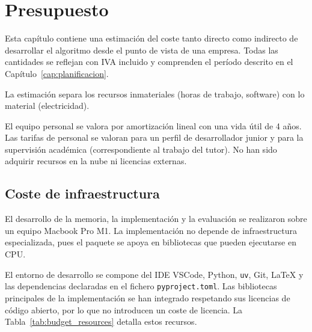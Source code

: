 \documentclass[12pt]{report} %
\begin{document}
\chapter{Presupuesto}
\label{cap:presupuesto}

Esta capítulo contiene una estimación del coste tanto directo como indirecto de desarrollar el algoritmo desde el punto de vista de una empresa. Todas las cantidades se reflejan con IVA incluido y comprenden el período descrito en el Capítulo~\ref{cap:planificacion}.

La estimación separa los recursos inmateriales (horas de trabajo, software) con lo material (electricidad).

El equipo personal se valora por amortización lineal con una vida útil de 4 años. Las tarifas de personal se valoran para un perfil de desarrollador junior y para la supervisión académica (correspondiente al trabajo del tutor). No han sido adquirir recursos en la nube ni licencias externas.

\section{Coste de infraestructura}

El desarrollo de la memoria, la implementación y la evaluación se realizaron sobre un equipo Macbook Pro M1. La implementación no depende de infraestructura especializada, pues el paquete se apoya en bibliotecas que pueden ejecutarse en CPU.

El entorno de desarrollo se compone del IDE VSCode, Python, \texttt{uv}, Git, \LaTeX{} y las dependencias declaradas en el fichero \texttt{pyproject.toml}. Las bibliotecas principales de la implementación se han integrado respetando sus licencias de código abierto, por lo que no introducen un coste de licencia. La Tabla~\ref{tab:budget_resources} detalla estos recursos.
\end{document}
